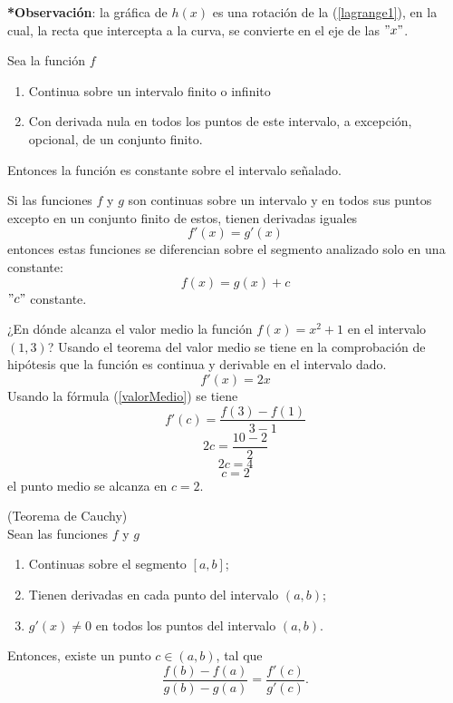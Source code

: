 \documentclass[10pt,twoside]{SelfArx} %
\begin{document}
\textbf{ *Observación}: la gráfica de $ h(x) $ es una rotación de la (\ref{lagrange1}), en la cual, la recta que intercepta a la curva, se convierte en el eje de las $ "x" $.
 \begin{corolario}
 	Sea la funci\'on $ f $
 	\begin{enumerate}
 		\item Continua sobre un intervalo finito o infinito
 		\item Con derivada nula en todos los puntos de este intervalo, a excepci\'on, opcional, de un conjunto finito.
 	\end{enumerate}
 Entonces la funci\'on es constante sobre el intervalo señalado.
 \end{corolario}
\begin{corolario}
	Si las funciones $ f $ y $ g $ son continuas sobre un intervalo y en todos sus puntos excepto en un conjunto finito de estos, tienen derivadas iguales
	\[ f'(x)=g'(x) \]
	entonces estas funciones se diferencian sobre el segmento analizado solo en una constante:
	\begin{equation}
	f(x)=g(x)+c
	\end{equation}
	$ "c" $ constante.
\end{corolario}
 \begin{ejemplo}
¿En dónde alcanza el valor medio la funci\'on $ f(x)=x^{2}+1  $ en el intervalo $ (1,3) $?
Usando el teorema del valor medio se tiene en la comprobación de hipótesis que la función es continua y derivable en el intervalo dado.
\begin{equation}
f'(x)=2x
\end{equation}
Usando la f\'ormula (\ref{valorMedio}) se tiene
\begin{equation}
f'(c)=\dfrac{f(3)-f(1)}{3-1}
\end{equation}
\begin{equation}
2c=\dfrac{10-2}{2}
\end{equation}
\begin{equation}
2c=4
\end{equation}
\begin{equation}
c=2
\end{equation}
el punto medio se alcanza en $ c=2 $.
 \end{ejemplo}
\begin{teorema}
	(Teorema de Cauchy)\\
	Sean las funciones $ f $ y $ g $
	\begin{enumerate}
		\item Continuas sobre el segmento $ [a,b] $;
		\item Tienen derivadas en cada punto del intervalo $ (a,b) $;
		\item $ g'(x)\neq 0 $ en todos los puntos del intervalo $ (a,b) $.
	\end{enumerate}
	Entonces, existe un punto $ c\in (a,b) $, tal que
	\begin{equation}
	\dfrac{f(b)-f(a)}{g(b)-g(a)}=\dfrac{f'(c)}{g'(c)}.
	\end{equation}
\end{teorema} 
\end{document}
